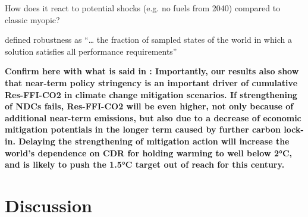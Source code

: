 How does it react to potential shocks (e.g. no fuels from 2040) compared to classic myopic?

\citet{herman2014beyond} defined robustness as ``… the fraction of sampled states of the world in which a solution satisfies all performance requirements''

%

%



\textbf{Confirm here with what is said in \cite{luderer2018residual}: 
Importantly, our results also show that near-term policy stringency is an important driver of cumulative Res-FFI-CO2 in climate change mitigation scenarios. If strengthening of NDCs fails, Res-FFI-CO2 will be even higher, not only because of additional near-term emissions, but also due to a decrease of economic mitigation potentials in the longer term caused by further carbon lock-in. Delaying the strengthening of mitigation action will increase the world’s dependence on CDR for holding warming to well below 2°C, and is likely to push the 1.5°C target out of reach for this century.}

\section{Discussion}
\label{sec:RL:discussion}

